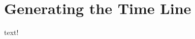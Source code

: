 \documentclass[paper.tex]{subfiles}
\begin{document}
	\section{Generating the Time Line}
	text!
	
	
\end{document}
